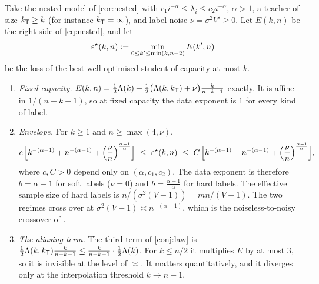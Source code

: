 \begin{theorem}\label{thm:law}
\Mo\Ck Take the nested model of \cref{cor:nested} with $c_1i^{-\alpha}\le\lambda_i\le c_2i^{-\alpha}$, $\alpha>1$, a teacher of size
$k_{\mathsf{T}}\ge k$ (for instance $k_{\mathsf{T}}=\infty$), and label noise $\nu=\sigma^2V'\ge0$. Let $E(k,n)$ be the right side of
\eqref{eq:nested}, and let
\[
\varepsilon^\star(k,n):=\min_{0\le k'\le\min(k,n-2)}E(k',n)
\]
be the loss of the best well-optimised student of capacity at most $k$.
\begin{enumerate}[label=(\alph*),nosep,leftmargin=*]
\item \emph{Fixed capacity.} $E(k,n)=\frac12\Lambda(k)+\frac12\big(\Lambda(k,k_{\mathsf{T}})+\nu\big)\frac k{n-k-1}$ exactly. It is affine in
$1/(n-k-1)$, so at fixed capacity the data exponent is $1$ for every kind of label.
\item \emph{Envelope.} For $k\ge1$ and $n\ge\max(4,\nu)$,
\[
c\,\Big[k^{-(\alpha-1)}+n^{-(\alpha-1)}+\Big(\frac{\nu}{n}\Big)^{\frac{\alpha-1}\alpha}\Big]\ \le\ \eps^\star(k,n)\ \le\ C\,\Big[k^{-(\alpha-1)}+n^{-(\alpha-1)}+\Big(\frac{\nu}{n}\Big)^{\frac{\alpha-1}\alpha}\Big],
\]
where $c,C>0$ depend only on $(\alpha,c_1,c_2)$. The data exponent is therefore $b=\alpha-1$ for soft labels
($\nu=0$) and $b=\frac{\alpha-1}\alpha$ for hard labels. The effective sample size of hard labels is
$n/(\sigma^2(V-1))=mn/(V-1)$. The two regimes cross over at $\sigma^2(V-1)\asymp n^{-(\alpha-1)}$, which is the
noiseless-to-noisy crossover of \citet{cui2021generalization}.
\item \emph{The aliasing term.} The third term of \cref{conj:law} is $\frac12\Lambda(k,k_{\mathsf{T}})\frac k{n-k-1}\le\frac k{n-k-1}\cdot\frac12\Lambda(k)$.
For $k\le n/2$ it multiplies $E$ by at most $3$, so it is invisible at the level of $\asymp$. It matters
quantitatively, and it diverges only at the interpolation threshold $k\to n-1$.
\end{enumerate}
\end{theorem}
